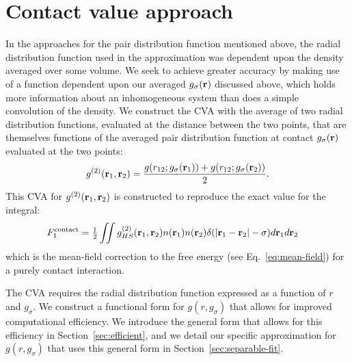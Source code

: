 \section{Contact value approach}
In the approaches for the pair distribution function
mentioned above, the radial distribution function used in the
approximation was dependent upon the density averaged over some
volume.  We seek to achieve greater accuracy by making use of a
function dependent upon our averaged $g_{\sigma}(\textbf{r})$ discussed
above, which holds more information about an inhomogeneous system than
does a simple convolution of the density.
%
We construct the CVA with the average of two radial distribution
functions, evaluated at the distance between the two points, that are
themselves functions of the averaged pair distribution function at contact
$g_{\sigma}(\textbf{r})$ evaluated at the two points:
\begin{align}
  g^{(2)}(\textbf{r}_1,\textbf{r}_2) = \frac{g(r_{12}; g_\sigma(\textbf{r}_1)) +
    g(r_{12}; g_\sigma(\textbf{r}_2))}{2}. \label{eq:g2-our-mean}
\end{align}
This CVA for $g^{(2)}(\textbf{r}_1,\textbf{r}_2)$ is
constructed to reproduce the exact value for the integral:
\begin{align}
  F_1^{\text{contact}} &= \tfrac12 \iint
  g^{(2)}_{HS}(\textbf{r}_1,\textbf{r}_2)n(\textbf{r}_1)n(\textbf{r}_2)\delta(|\textbf{r}_1-\textbf{r}_2|-\sigma)
  d\textbf{r}_1d\textbf{r}_2
  \label{eq:mean-field-contact}
\end{align}
which is the mean-field correction to the free energy (see
Eq.~\ref{eq:mean-field}) for a purely contact interaction.

The CVA requires the radial distribution function expressed as a
function of $r$ and $g_\sigma$.
%
%
We construct a functional form for $g(r, g_\sigma)$ that allows for
improved computational efficiency.  We introduce the general form that
allows for this efficiency in Section~\ref{sec:efficient}, and we
detail our specific approximation for $g(r,g_\sigma)$ that uses this
general form in Section~\ref{sec:separable-fit}.
%



